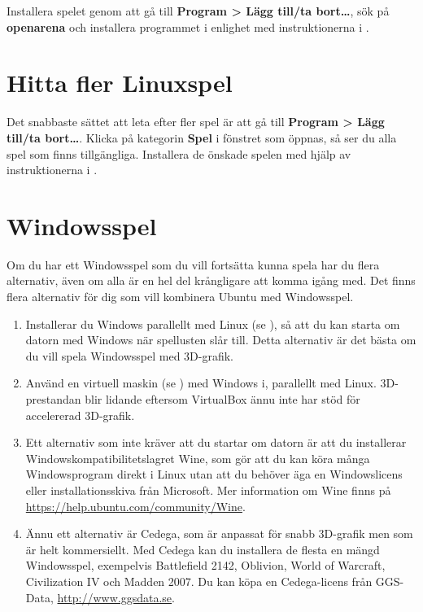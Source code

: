 \documentclass[a4paper,final]{memoir} %
\begin{document}
Installera spelet genom att gå till \textbf{Program \textgreater{} Lägg till/ta bort\ldots{}}, sök på \textbf{openarena} och installera programmet i enlighet med instruktionerna i .

\section{Hitta fler Linuxspel}

Det snabbaste sättet att leta efter fler spel är att gå till \textbf{Program \textgreater{} Lägg till/ta bort\ldots{}}. Klicka på kategorin \textbf{Spel} i fönstret som öppnas, så ser du alla spel som finns tillgängliga. Installera de önskade spelen med hjälp av instruktionerna i .

\section{Windowsspel}

Om du har ett Windowsspel som du vill fortsätta kunna spela har du flera alternativ, även om alla är en hel del krångligare att komma igång med. Det finns flera alternativ för dig som vill kombinera Ubuntu med Windowsspel.

\begin{enumerate}

\item Installerar du Windows parallellt med Linux (se ), så att du kan starta om datorn med Windows när spellusten slår till. Detta alternativ är det bästa om du vill spela Windowsspel med 3D-grafik.

\item Använd en virtuell maskin (se ) med Windows i, parallellt med Linux. 3D-prestandan blir lidande eftersom VirtualBox ännu inte har stöd för accelererad 3D-grafik. 

\item Ett alternativ som inte kräver att du startar om datorn är att du installerar Windowskompatibilitetslagret Wine, som gör att du kan köra många Windowsprogram direkt i Linux utan att du behöver äga en Windowslicens eller installationsskiva från Microsoft. Mer information om Wine finns på \url{https://help.ubuntu.com/community/Wine}. 

\item Ännu ett alternativ är Cedega, som är anpassat för snabb 3D-grafik men som är helt kommersiellt. Med Cedega kan du installera de flesta en mängd Windowsspel, exempelvis Battlefield 2142, Oblivion, World of Warcraft, Civilization IV och Madden 2007. Du kan köpa en Cedega-licens från GGS-Data, \url{http://www.ggsdata.se}.

\end{enumerate}
\end{document}
